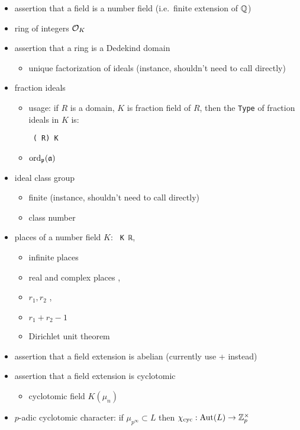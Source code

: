 \begin{itemize}
\item
assertion that a field is a number field (i.e.~finite extension of ${\mathbb {Q}}$)
\item
ring of integers ${\mathcal {O}}_K$ 
\item
assertion that a ring is a Dedekind domain 
\begin{itemize}
\item
unique factorization of ideals 
(instance, shouldn't need to call directly)
\end{itemize}
\item
fraction ideals 
\begin{itemize}
\item
usage: if $R$ is a domain, $K$ is fraction field of $R$,
then the \verb|Type| of fraction ideals in $K$ is:

\verb| (|\verb| R) K|
\item
$\operatorname{ord}_{\mathfrak{p}}({\mathfrak{a}})$ 
\end{itemize}
\item
ideal class group 
\begin{itemize}
\item
finite 
(instance, shouldn't need to call directly)
\item
class number 
\end{itemize}
\item
places of a number field $K$:
\verb| K ℝ|, 
\begin{itemize}
\item
infinite places 
\item
real and complex places
,
\item
$r_1,r_2$
,
\item
$r_1+r_2-1$
\item
Dirichlet unit theorem
\end{itemize}
\item
assertion that a field extension is abelian
(currently use  +  instead)
\item
assertion that a field extension is cyclotomic
\begin{itemize}
\item
cyclotomic field $K(\mu_n)$
\end{itemize}
\item
$p$-adic cyclotomic character:
if $\mu_{p^\infty}\subset L$
then $\chi_{\mathrm{cyc}}:{\mathrm{Aut}}(L)\to{\mathbb {Z}}_p^\times$
\end{itemize}

